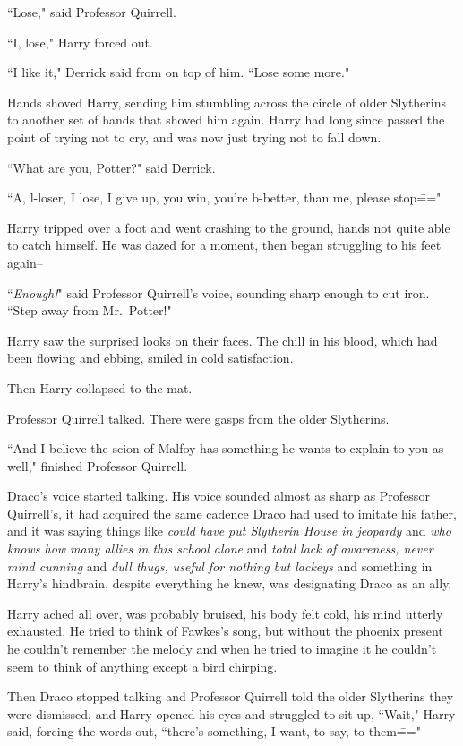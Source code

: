 ``Lose," said Professor Quirrell.

``I, lose," Harry forced out.

``I like it," Derrick said from on top of him. ``Lose some more."

\later

Hands shoved Harry, sending him stumbling across the circle of older Slytherins to another set of hands that shoved him again. Harry had long since passed the point of trying not to cry, and was now just trying not to fall down.

``What are you, Potter?" said Derrick.

``A, l-loser, I lose, I give up, you win, you're b-better, than me, please stop\==="

Harry tripped over a foot and went crashing to the ground, hands not quite able to catch himself. He was dazed for a moment, then began struggling to his feet again\---

``\emph{Enough!}" said Professor Quirrell's voice, sounding sharp enough to cut iron. ``Step away from Mr.~Potter!"

Harry saw the surprised looks on their faces. The chill in his blood, which had been flowing and ebbing, smiled in cold satisfaction.

Then Harry collapsed to the mat.

Professor Quirrell talked. There were gasps from the older Slytherins.

``And I believe the scion of Malfoy has something he wants to explain to you as well," finished Professor Quirrell.

Draco's voice started talking. His voice sounded almost as sharp as Professor Quirrell's, it had acquired the same cadence Draco had used to imitate his father, and it was saying things like \emph{could have put Slytherin House in jeopardy} and \emph{who knows how many allies in this school alone} and \emph{total lack of awareness, never mind cunning} and \emph{dull thugs, useful for nothing but lackeys} and something in Harry's hindbrain, despite everything he knew, was designating Draco as an ally.

Harry ached all over, was probably bruised, his body felt cold, his mind utterly exhausted. He tried to think of Fawkes's song, but without the phoenix present he couldn't remember the melody and when he tried to imagine it he couldn't seem to think of anything except a bird chirping.

Then Draco stopped talking and Professor Quirrell told the older Slytherins they were dismissed, and Harry opened his eyes and struggled to sit up, ``Wait," Harry said, forcing the words out, ``there's something, I want, to say, to them\==="


